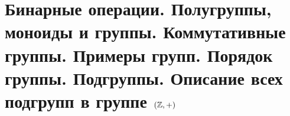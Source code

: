 \section{Бинарные операции. Полугруппы, моноиды и группы. Коммутативные группы. Примеры групп. Порядок группы. Подгруппы. Описание всех подгрупп в группе $(\mathbb{Z}, +)$}
